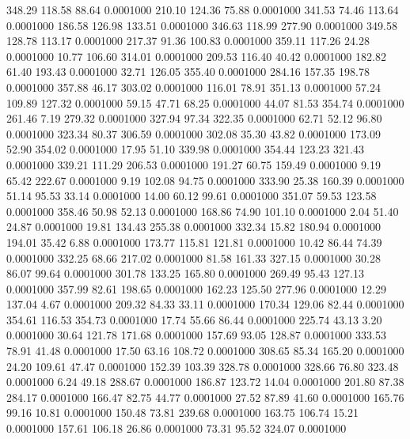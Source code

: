  348.29  118.58   88.64   0.0001000
 210.10  124.36   75.88   0.0001000
 341.53   74.46  113.64   0.0001000
 186.58  126.98  133.51   0.0001000
 346.63  118.99  277.90   0.0001000
 349.58  128.78  113.17   0.0001000
 217.37   91.36  100.83   0.0001000
 359.11  117.26   24.28   0.0001000
  10.77  106.60  314.01   0.0001000
 209.53  116.40   40.42   0.0001000
 182.82   61.40  193.43   0.0001000
  32.71  126.05  355.40   0.0001000
 284.16  157.35  198.78   0.0001000
 357.88   46.17  303.02   0.0001000
 116.01   78.91  351.13   0.0001000
  57.24  109.89  127.32   0.0001000
  59.15   47.71   68.25   0.0001000
  44.07   81.53  354.74   0.0001000
 261.46    7.19  279.32   0.0001000
 327.94   97.34  322.35   0.0001000
  62.71   52.12   96.80   0.0001000
 323.34   80.37  306.59   0.0001000
 302.08   35.30   43.82   0.0001000
 173.09   52.90  354.02   0.0001000
  17.95   51.10  339.98   0.0001000
 354.44  123.23  321.43   0.0001000
 339.21  111.29  206.53   0.0001000
 191.27   60.75  159.49   0.0001000
   9.19   65.42  222.67   0.0001000
   9.19  102.08   94.75   0.0001000
 333.90   25.38  160.39   0.0001000
  51.14   95.53   33.14   0.0001000
  14.00   60.12   99.61   0.0001000
 351.07   59.53  123.58   0.0001000
 358.46   50.98   52.13   0.0001000
 168.86   74.90  101.10   0.0001000
   2.04   51.40   24.87   0.0001000
  19.81  134.43  255.38   0.0001000
 332.34   15.82  180.94   0.0001000
 194.01   35.42    6.88   0.0001000
 173.77  115.81  121.81   0.0001000
  10.42   86.44   74.39   0.0001000
 332.25   68.66  217.02   0.0001000
  81.58  161.33  327.15   0.0001000
  30.28   86.07   99.64   0.0001000
 301.78  133.25  165.80   0.0001000
 269.49   95.43  127.13   0.0001000
 357.99   82.61  198.65   0.0001000
 162.23  125.50  277.96   0.0001000
  12.29  137.04    4.67   0.0001000
 209.32   84.33   33.11   0.0001000
 170.34  129.06   82.44   0.0001000
 354.61  116.53  354.73   0.0001000
  17.74   55.66   86.44   0.0001000
 225.74   43.13    3.20   0.0001000
  30.64  121.78  171.68   0.0001000
 157.69   93.05  128.87   0.0001000
 333.53   78.91   41.48   0.0001000
  17.50   63.16  108.72   0.0001000
 308.65   85.34  165.20   0.0001000
  24.20  109.61   47.47   0.0001000
 152.39  103.39  328.78   0.0001000
 328.66   76.80  323.48   0.0001000
   6.24   49.18  288.67   0.0001000
 186.87  123.72   14.04   0.0001000
 201.80   87.38  284.17   0.0001000
 166.47   82.75   44.77   0.0001000
  27.52   87.89   41.60   0.0001000
 165.76   99.16   10.81   0.0001000
 150.48   73.81  239.68   0.0001000
 163.75  106.74   15.21   0.0001000
 157.61  106.18   26.86   0.0001000
  73.31   95.52  324.07   0.0001000
